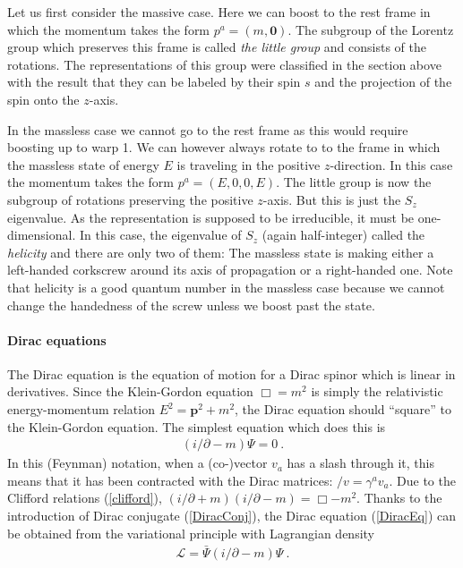 \documentclass[12pt]{article}
\begin{document}
Let us first consider the massive case. Here we can boost to the rest frame in which the momentum takes the form $p^a=(m, \mathbf 0)$. The subgroup of the Lorentz group which preserves this frame is called {\em the little group} and consists of the rotations. The representations of this group were classified in the section above with the result that they can be labeled by their spin $s$ and the projection of the spin onto the $z$-axis.

In the massless case we cannot go to the rest frame as this would require boosting up to warp 1. We can however always rotate to to the frame in which the massless state of energy $E$ is traveling in the positive $z$-direction. In this case the momentum takes the form $p^a=(E,0,0,E)$. The little group is now the subgroup of rotations preserving the positive $z$-axis. But this is just the $S_z$ eigenvalue. As the representation is supposed to be irreducible, it must be one-dimensional. In this case, the eigenvalue of $S_z$ (again half-integer) called the {\em helicity} and there are only two of them: The massless state is making either a left-handed corkscrew around its axis of propagation or a right-handed one. Note that helicity is a good quantum number in the massless case because we cannot change the handedness of the screw unless we boost past the state. 

\paragraph{Dirac equations} The Dirac equation is the equation of motion for a Dirac spinor which is linear in derivatives. Since the Klein-Gordon equation $\Box=m^2$ is simply the relativistic energy-momentum relation $E^2=\mathbf p^2+m^2$, the Dirac equation should ``square'' to the Klein-Gordon equation. The simplest equation which does this is
\begin{eqnarray}
\label{DiracEq}
(i\slash\!\!\! \partial -m)\Psi=0~.
\end{eqnarray}
In this (Feynman) notation, when a (co-)vector $v_a$ has a slash through it, this means that it has been contracted with the Dirac matrices: $\slash \!\!\! v=\gamma^a v_a$. Due to the Clifford relations (\ref{clifford}), 
$(i\slash\!\!\! \partial +m)(i\slash\!\!\! \partial -m)= \Box-m^2$.
Thanks to the introduction of Dirac conjugate (\ref{DiracConj}), the Dirac equation (\ref{DiracEq}) can be obtained from the variational principle with Lagrangian density
\begin{eqnarray}
\mathcal L= \bar \Psi (i \slash\!\!\! \partial -m) \Psi~.
\end{eqnarray}
\end{document}

